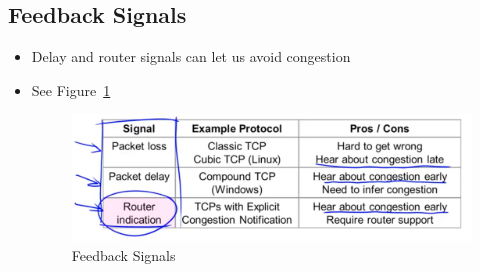 \documentclass[12pt]{ctexart}   %
\begin{document}
	\subsection{Feedback Signals}
	\begin{itemize}
		\item Delay and router signals can let us avoid congestion
		\item See Figure~\ref{fig:7-8-2}
		  
		 \begin{figure}[h!] %
		\centering
		 \includegraphics[scale=0.7]{images/7-8-2}
		\caption{ Feedback Signals }
		 \label{fig:7-8-2}
		 \end{figure}
	\end{itemize}
	
\end{document}
